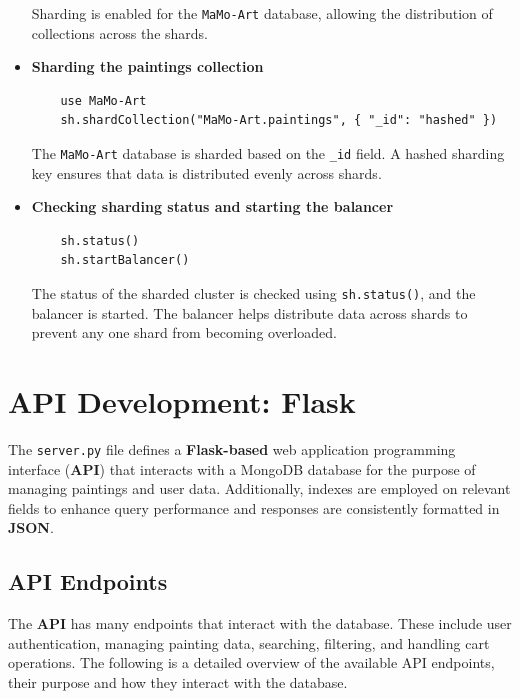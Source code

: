 \documentclass[a4paper,12pt]{article}
\begin{document}
\begin{itemize}
            Sharding is enabled for the \texttt{MaMo-Art} database, allowing the distribution of collections across the shards.

      \item \textbf{Sharding the paintings collection}

            \begin{lstlisting}
    use MaMo-Art
    sh.shardCollection("MaMo-Art.paintings", { "_id": "hashed" })
    \end{lstlisting}

            The \texttt{MaMo-Art} database is sharded based on the \texttt{\_id} field. A hashed sharding key ensures that data is distributed evenly across shards.

      \item \textbf{Checking sharding status and starting the balancer}

            \begin{lstlisting}
    sh.status()
    sh.startBalancer()
    \end{lstlisting}

            The status of the sharded cluster is checked using \texttt{sh.status()}, and the balancer is started. The balancer helps distribute data across shards to prevent any one shard from becoming overloaded.
\end{itemize}

\newpage
\section{API Development: Flask}
\justify

The \texttt{server.py} file defines a \textbf{Flask-based} web application programming interface (\textbf{API}) that interacts with a MongoDB database for the purpose of managing paintings and user data. Additionally, indexes are employed on relevant fields to enhance query performance and responses are consistently formatted in \textbf{JSON}.


\subsection{API Endpoints} \justify The \textbf{API} has many endpoints that interact with the database. These include user authentication, managing painting data, searching, filtering, and handling cart operations. The following is a detailed overview of the available API endpoints, their purpose and how they interact with the database.
\end{document}
